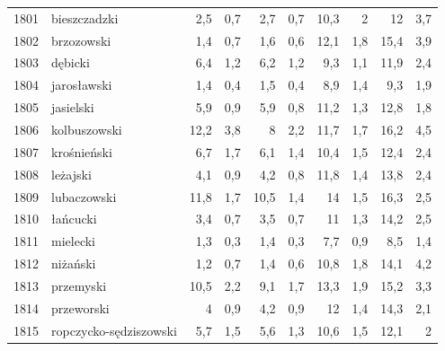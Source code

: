 \begin{center}
\begin{longtable}{lp{3cm}rrrrrrrr}
1801 & bieszczadzki            & 2,5     & 0,7         & 2,7      & 0,7          & 10,3     & 2            & 12       & 3,7          \\
1802 & brzozowski              & 1,4     & 0,7         & 1,6      & 0,6          & 12,1     & 1,8          & 15,4     & 3,9          \\
1803 & dębicki                 & 6,4     & 1,2         & 6,2      & 1,2          & 9,3      & 1,1          & 11,9     & 2,4          \\
1804 & jarosławski             & 1,4     & 0,4         & 1,5      & 0,4          & 8,9      & 1,4          & 9,3      & 1,9          \\
1805 & jasielski               & 5,9     & 0,9         & 5,9      & 0,8          & 11,2     & 1,3          & 12,8     & 1,8          \\
1806 & kolbuszowski            & 12,2    & 3,8         & 8        & 2,2          & 11,7     & 1,7          & 16,2     & 4,5          \\
1807 & krośnieński             & 6,7     & 1,7         & 6,1      & 1,4          & 10,4     & 1,5          & 12,4     & 2,4          \\
1808 & leżajski                & 4,1     & 0,9         & 4,2      & 0,8          & 11,8     & 1,4          & 13,8     & 2,4          \\
1809 & lubaczowski             & 11,8    & 1,7         & 10,5     & 1,4          & 14       & 1,5          & 16,3     & 2,5          \\
1810 & łańcucki                & 3,4     & 0,7         & 3,5      & 0,7          & 11       & 1,3          & 14,2     & 2,5          \\
1811 & mielecki                & 1,3     & 0,3         & 1,4      & 0,3          & 7,7      & 0,9          & 8,5      & 1,4          \\
1812 & niżański                & 1,2     & 0,7         & 1,4      & 0,6          & 10,8     & 1,8          & 14,1     & 4,2          \\
1813 & przemyski               & 10,5    & 2,2         & 9,1      & 1,7          & 13,3     & 1,9          & 15,2     & 3,3          \\
1814 & przeworski              & 4       & 0,9         & 4,2      & 0,9          & 12       & 1,4          & 14,3     & 2,1          \\
1815 & ropczycko-sędziszowski  & 5,7     & 1,5         & 5,6      & 1,3          & 10,6     & 1,5          & 12,1     & 2            \\

\end{longtable}
\end{center}
